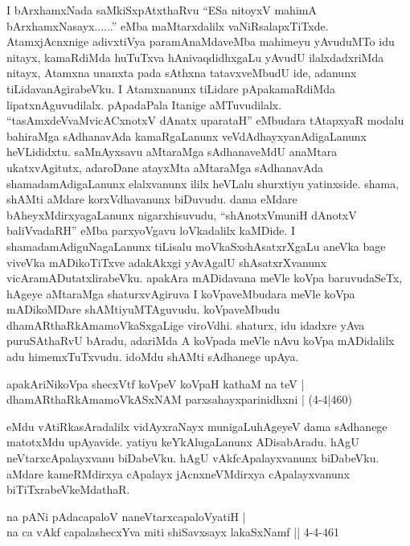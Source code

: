 \begin{artha}
I bArxhamxNada saMkiSxpAtxthaRvu ``ESa nitoyxV mahimA bArxhamxNasayx......'' eMba maMtarxdalilx vaNiRsalapxTiTxde. AtamxjAcnxnige adivxtiVya paramAnaMdaveMba mahimeyu yAvuduMTo idu nitayx, kamaRdiMda huTuTxva hAnivaqdidhxgaLu yAvudU ilalxdadxriMda nitayx, Atamxna unanxta pada sAthxna tatavxveMbudU ide, adanunx tiLidavanAgirabeVku. I Atamxnanunx tiLidare pApakamaRdiMda lipatxnAguvudilalx. pApadaPala Itanige aMTuvudilalx. ``tasAmxdeVvaMvicACxnotxV dAnatx uparataH'' eMbudara tAtapxyaR modalu bahiraMga sAdhanavAda kamaRgaLanunx veVdAdhayxyanAdigaLanunx heVLididxtu. saMnAyxsavu aMtaraMga sAdhanaveMdU anaMtara ukatxvAgitutx, adaroDane atayxMta aMtaraMga sAdhanavAda shamadamAdigaLanunx elalxvanunx ililx heVLalu shurxtiyu yatinxside. shama, shAMti aMdare korxVdhavanunx biDuvudu. dama eMdare bAheyxMdirxyagaLanunx nigarxhisuvudu, ``shAnotxVmuniH dAnotxV baliVvadaRH'' eMba parxyoVgavu loVkadalilx kaMDide. I shamadamAdiguNagaLanunx tiLisalu moVkaSxshAsatxrXgaLu aneVka bage viveVka mADikoTiTxve adakAkxgi yAvAgalU shAsatxrXvanunx vicAramADutatxlirabeVku. apakAra mADidavana meVle koVpa baruvudaSeTx, hAgeye aMtaraMga shaturxvAgiruva I koVpaveMbudara meVle koVpa mADikoMDare shAMtiyuMTAguvudu. koVpaveMbudu dhamARthaRkAmamoVkaSxgaLige viroVdhi. shaturx, idu idadxre yAva puruSAthaRvU bAradu, adariMda A koVpada meVle nAvu koVpa mADidalilx adu himemxTuTxvudu. idoMdu shAMti sAdhanege upAya. 
\end{artha}

\begin{shl}
apakAriNikoVpa shecxVtf koVpeV koVpaH kathaM na teV |\\
dhamARthaRkAmamoVkASxNAM parxsahayxparinidhxni | (4-4|460)
\end{shl}

\begin{artha}
eMdu vAtiRkasAradalilx vidAyxraNayx munigaLu\ndash  hAgeyeV dama sAdhanege matotxMdu upAyavide. yatiyu keYkAlugaLanunx ADisabAradu. hAgU neVtarxcApalayxvanu biDabeVku. hAgU vAkfcApalayxvanunx biDabeVku. aMdare kameRMdirxya cApalayx jAcnxneVMdirxya cApalayxvanunx biTiTxrabeVkeMdathaR. 
\end{artha}

\begin{shl}
na pANi pAdacapaloV naneVtarxcapaloVyatiH |\\
na ca vAkf capalashecxYva miti shiSavxsayx lakaSxNamf || 4-4-461
\end{shl}


